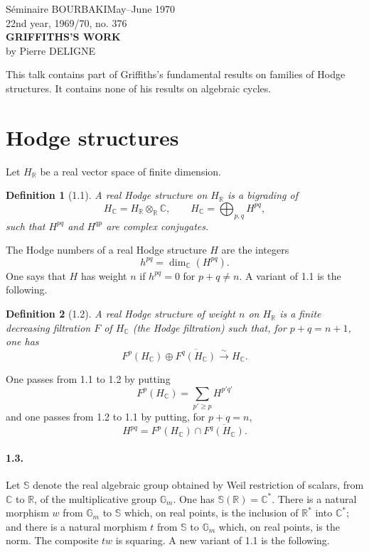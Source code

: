 \documentclass[10pt]{article}
\newcommand{\C}{\mathbb C}
\newcommand{\R}{\mathbb R}
\newcommand{\Gm}{\mathbb G_m}
\newcommand{\bS}{\mathbb S}
\theoremstyle{deligne}
\newtheorem*{definition}{Definition}
\begin{document}
\begin{center}
Séminaire BOURBAKI\hfill May--June 1970\\
22nd year, 1969/70, no. 376\\[2.2em]
{\Large\bfseries GRIFFITHS'S WORK}\\[1.2em]
by Pierre DELIGNE
\end{center}

This talk contains part of Griffiths's fundamental results on families of Hodge structures. It contains none of his results on algebraic cycles.

\section{Hodge structures}

Let $H_\R$ be a real vector space of finite dimension.

\begin{definition}[1.1]
A real Hodge structure on $H_\R$ is a bigrading of
\[
H_\C=H_\R\otimes_\R\C,
\qquad
H_\C=\bigoplus_{p,q}H^{pq},
\]
such that $H^{pq}$ and $H^{qp}$ are complex conjugates.
\end{definition}

The Hodge numbers of a real Hodge structure $H$ are the integers
\[
h^{pq}=\dim_\C(H^{pq}).
\]
One says that $H$ has weight $n$ if $h^{pq}=0$ for $p+q\ne n$. A variant of 1.1 is the following.

\begin{definition}[1.2]
A real Hodge structure of weight $n$ on $H_\R$ is a finite decreasing filtration $F$ of $H_\C$ (the Hodge filtration) such that, for $p+q=n+1$, one has
\begin{equation}
F^p(H_\C)\oplus \overline{F^q(H_\C)}\xrightarrow{\sim}H_\C .
\tag{1.2.1}
\end{equation}
\end{definition}

One passes from 1.1 to 1.2 by putting
\begin{equation}
F^p(H_\C)=\sum_{p'\ge p}H^{p'q'}
\tag{1.2.2}
\end{equation}
and one passes from 1.2 to 1.1 by putting, for $p+q=n$,
\begin{equation}
H^{pq}=F^p(H_\C)\cap \overline{F^q(H_\C)} .
\tag{1.2.3}
\end{equation}

\paragraph{1.3.}
Let $\bS$ denote the real algebraic group obtained by Weil restriction of scalars, from $\C$ to $\R$, of the multiplicative group $\Gm$. One has $\bS(\R)=\C^*$. There is a natural morphism $w$ from $\Gm$ to $\bS$ which, on real points, is the inclusion of $\R^*$ into $\C^*$; and there is a natural morphism $t$ from $\bS$ to $\Gm$ which, on real points, is the norm. The composite $tw$ is squaring. A new variant of 1.1 is the following.
\end{document}
